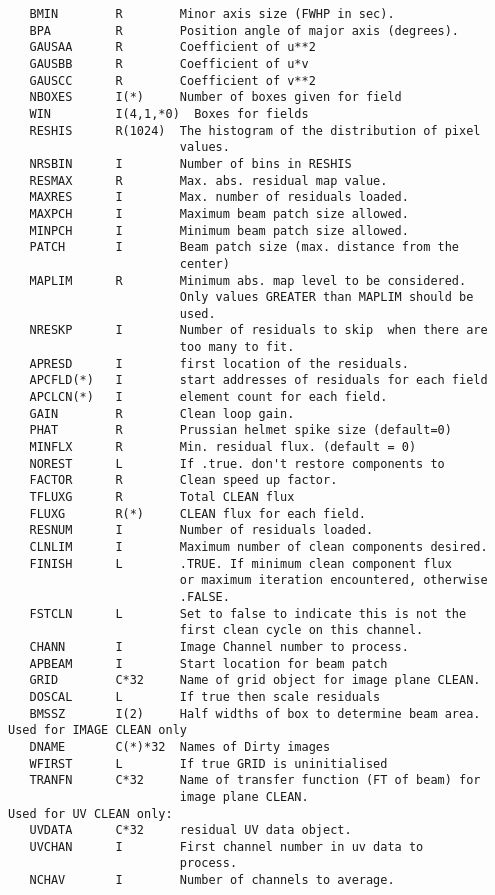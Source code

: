 {\begin{verbatim}
   BMIN        R        Minor axis size (FWHP in sec).
   BPA         R        Position angle of major axis (degrees).
   GAUSAA      R        Coefficient of u**2
   GAUSBB      R        Coefficient of u*v
   GAUSCC      R        Coefficient of v**2
   NBOXES      I(*)     Number of boxes given for field
   WIN         I(4,1,*0)  Boxes for fields
   RESHIS      R(1024)  The histogram of the distribution of pixel
                        values.
   NRSBIN      I        Number of bins in RESHIS
   RESMAX      R        Max. abs. residual map value.
   MAXRES      I        Max. number of residuals loaded.
   MAXPCH      I        Maximum beam patch size allowed.
   MINPCH      I        Minimum beam patch size allowed.
   PATCH       I        Beam patch size (max. distance from the
                        center)
   MAPLIM      R        Minimum abs. map level to be considered.
                        Only values GREATER than MAPLIM should be
                        used.
   NRESKP      I        Number of residuals to skip  when there are
                        too many to fit.
   APRESD      I        first location of the residuals.
   APCFLD(*)   I        start addresses of residuals for each field
   APCLCN(*)   I        element count for each field.
   GAIN        R        Clean loop gain.
   PHAT        R        Prussian helmet spike size (default=0)
   MINFLX      R        Min. residual flux. (default = 0)
   NOREST      L        If .true. don't restore components to
   FACTOR      R        Clean speed up factor.
   TFLUXG      R        Total CLEAN flux
   FLUXG       R(*)     CLEAN flux for each field.
   RESNUM      I        Number of residuals loaded.
   CLNLIM      I        Maximum number of clean components desired.
   FINISH      L        .TRUE. If minimum clean component flux
                        or maximum iteration encountered, otherwise
                        .FALSE.
   FSTCLN      L        Set to false to indicate this is not the
                        first clean cycle on this channel.
   CHANN       I        Image Channel number to process.
   APBEAM      I        Start location for beam patch
   GRID        C*32     Name of grid object for image plane CLEAN.
   DOSCAL      L        If true then scale residuals
   BMSSZ       I(2)     Half widths of box to determine beam area.
Used for IMAGE CLEAN only
   DNAME       C(*)*32  Names of Dirty images
   WFIRST      L        If true GRID is uninitialised
   TRANFN      C*32     Name of transfer function (FT of beam) for
                        image plane CLEAN.
Used for UV CLEAN only:
   UVDATA      C*32     residual UV data object.
   UVCHAN      I        First channel number in uv data to
                        process.
   NCHAV       I        Number of channels to average.
\end{verbatim}}


